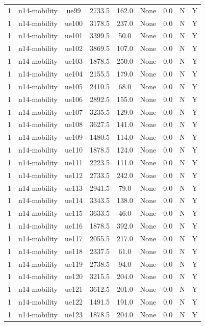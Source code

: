 \begin{table}[ht]
\begin{tabular}{|c|c|c|c|c|c|c|c|c|}
1 & n14-mobility & ue99 & 2733.5 & 162.0 & None & 0.0 & N & Y \\
1 & n14-mobility & ue100 & 3178.5 & 237.0 & None & 0.0 & N & Y \\
1 & n14-mobility & ue101 & 3399.5 & 50.0 & None & 0.0 & N & Y \\
1 & n14-mobility & ue102 & 3869.5 & 107.0 & None & 0.0 & N & Y \\
1 & n14-mobility & ue103 & 1878.5 & 250.0 & None & 0.0 & N & Y \\
1 & n14-mobility & ue104 & 2155.5 & 179.0 & None & 0.0 & N & Y \\
1 & n14-mobility & ue105 & 2410.5 & 68.0 & None & 0.0 & N & Y \\
1 & n14-mobility & ue106 & 2892.5 & 155.0 & None & 0.0 & N & Y \\
1 & n14-mobility & ue107 & 3235.5 & 129.0 & None & 0.0 & N & Y \\
1 & n14-mobility & ue108 & 3627.5 & 141.0 & None & 0.0 & N & Y \\
1 & n14-mobility & ue109 & 1480.5 & 114.0 & None & 0.0 & N & Y \\
1 & n14-mobility & ue110 & 1878.5 & 124.0 & None & 0.0 & N & Y \\
1 & n14-mobility & ue111 & 2223.5 & 111.0 & None & 0.0 & N & Y \\
1 & n14-mobility & ue112 & 2733.5 & 242.0 & None & 0.0 & N & Y \\
1 & n14-mobility & ue113 & 2941.5 & 79.0 & None & 0.0 & N & Y \\
1 & n14-mobility & ue114 & 3343.5 & 138.0 & None & 0.0 & N & Y \\
1 & n14-mobility & ue115 & 3633.5 & 46.0 & None & 0.0 & N & Y \\
1 & n14-mobility & ue116 & 1878.5 & 392.0 & None & 0.0 & N & Y \\
1 & n14-mobility & ue117 & 2055.5 & 217.0 & None & 0.0 & N & Y \\
1 & n14-mobility & ue118 & 2337.5 & 61.0 & None & 0.0 & N & Y \\
1 & n14-mobility & ue119 & 2738.5 & 94.0 & None & 0.0 & N & Y \\
1 & n14-mobility & ue120 & 3215.5 & 204.0 & None & 0.0 & N & Y \\
1 & n14-mobility & ue121 & 3612.5 & 201.0 & None & 0.0 & N & Y \\
1 & n14-mobility & ue122 & 1491.5 & 191.0 & None & 0.0 & N & Y \\
1 & n14-mobility & ue123 & 1878.5 & 204.0 & None & 0.0 & N & Y \\

\end{tabular}
\end{table}

